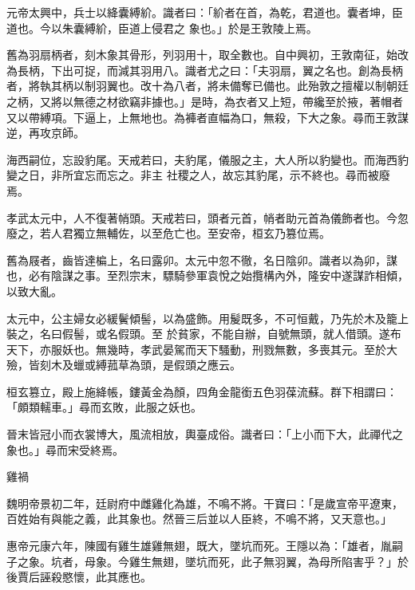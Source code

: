 \begin{pinyinscope}
 元帝太興中，兵士以絳囊縛紒。識者曰：「紒者在首，為乾，君道也。囊者坤，臣道也。今以朱囊縛紒，臣道上侵君之
 象也。」於是王敦陵上焉。



 舊為羽扇柄者，刻木象其骨形，列羽用十，取全數也。自中興初，王敦南征，始改為長柄，下出可捉，而減其羽用八。識者尤之曰：「夫羽扇，翼之名也。創為長柄者，將執其柄以制羽翼也。改十為八者，將未備奪已備也。此殆敦之擅權以制朝廷之柄，又將以無德之材欲竊非據也。」是時，為衣者又上短，帶纔至於掖，著帽者又以帶縛項。下逼上，上無地也。為褲者直幅為口，無殺，下大之象。尋而王敦謀逆，再攻京師。



 海西嗣位，忘設豹尾。天戒若曰，夫豹尾，儀服之主，大人所以豹變也。而海西豹變之日，非所宜忘而忘之。非主
 社稷之人，故忘其豹尾，示不終也。尋而被廢焉。



 孝武太元中，人不復著帩頭。天戒若曰，頭者元首，帩者助元首為儀飾者也。今忽廢之，若人君獨立無輔佐，以至危亡也。至安帝，桓玄乃篡位焉。



 舊為屐者，齒皆達楄上，名曰露卯。太元中忽不徹，名日陰卯。識者以為卯，謀也，必有陰謀之事。至烈宗末，驃騎參軍袁悅之始攬構內外，隆安中遂謀詐相傾，以致大亂。



 太元中，公主婦女必緩鬢傾髻，以為盛飾。用髲既多，不可恒戴，乃先於木及籠上裝之，名曰假髻，或名假頭。至
 於貧家，不能自辦，自號無頭，就人借頭。遂布天下，亦服妖也。無幾時，孝武晏駕而天下騷動，刑戮無數，多喪其元。至於大殮，皆刻木及蠟或縛菰草為頭，是假頭之應云。



 桓玄篡立，殿上施絳帳，鏤黃金為顏，四角金龍銜五色羽葆流蘇。群下相謂曰：「頗類轜車。」尋而玄敗，此服之妖也。



 晉末皆冠小而衣裳博大，風流相放，輿臺成俗。識者曰：「上小而下大，此禪代之象也。」尋而宋受終焉。



 雞禍



 魏明帝景初二年，廷尉府中雌雞化為雄，不鳴不將。干寶曰：「是歲宣帝平遼東，百姓始有與能之義，此其象也。然晉三后並以人臣終，不鳴不將，又天意也。」



 惠帝元康六年，陳國有雞生雄雞無翅，既大，墜坑而死。王隱以為：「雄者，胤嗣子之象。坑者，母象。今雞生無翅，墜坑而死，此子無羽翼，為母所陷害乎？」於後賈后誣殺愍懷，此其應也。




\end{pinyinscope}
